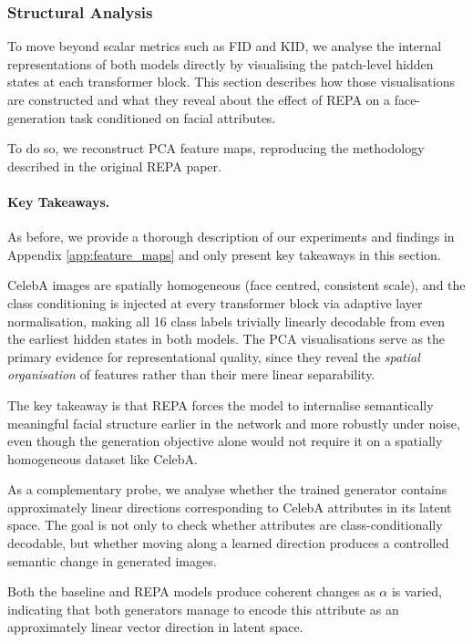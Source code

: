 \subsubsection{Structural Analysis}

To move beyond scalar metrics such as FID and KID, we analyse the internal
representations of both models directly by visualising the patch-level hidden
states at each transformer block. This section describes how those
visualisations are constructed and what they reveal about the effect of REPA
on a face-generation task conditioned on facial attributes.

To do so, we reconstruct PCA feature maps, reproducing the methodology described
in the original REPA paper.

\paragraph{Key Takeaways.} As before, we provide a thorough description of our
experiments and findings in Appendix \ref{app:feature_maps} and only present key takeaways in this section.

CelebA images are spatially homogeneous (face centred, consistent scale), and the
class conditioning is injected at every transformer block via adaptive layer
normalisation, making all 16 class labels trivially linearly decodable from
even the earliest hidden states in both models. The
PCA visualisations serve as the primary evidence for representational
quality, since they reveal the \emph{spatial organisation} of features rather
than their mere linear separability.

The key takeaway is that REPA forces the model to internalise
semantically meaningful facial structure earlier in the network and more
robustly under noise, even though the generation objective alone would not
require it on a spatially homogeneous dataset like CelebA.

As a complementary probe, we analyse whether the trained generator contains
approximately linear directions corresponding to CelebA attributes in its latent
space. The goal is not only to check whether attributes are class-conditionally
decodable, but whether moving along a learned direction produces a controlled
semantic change in generated images.

Both the baseline and REPA models produce coherent
changes as $\alpha$ is varied, indicating that both generators manage
to encode this attribute as an approximately linear vector direction in latent
space.
